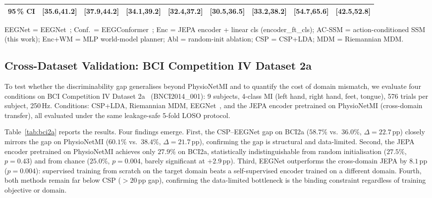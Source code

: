 \documentclass[journal]{IEEEtran}
\begin{document}
\begin{table}[t]
\begin{tabular}{crrrrrrrr}
\textbf{95\,\% CI} & [35.6,41.2] & [37.9,44.2] & [34.1,39.2] & [32.4,37.2] & [30.5,36.5] & [33.2,38.2] & [54.7,65.6] & [42.5,52.8] \\
\bottomrule
\end{tabular}
\par\vspace{2pt}
\begin{minipage}{\linewidth}
{\footnotesize\raggedright EEGNet = EEGNet~\cite{lawhern2018eegnet};
Conf.\ = EEGConformer~\cite{song2022eegconformer};
Enc = JEPA encoder + linear cls (encoder\_ft\_cls); AC-SSM = action-conditioned SSM (this work);
Enc+WM = MLP world-model planner; Abl = random-init ablation; CSP = CSP+LDA; MDM = Riemannian MDM.}
\end{minipage}
\end{table}

\subsection{Cross-Dataset Validation: BCI Competition IV Dataset 2a}
\label{sec:bci2a}

To test whether the discriminability gap generalises beyond PhysioNetMI and to quantify the cost of domain mismatch, we evaluate four conditions on BCI Competition IV Dataset 2a~\cite{brunner2008bci} (BNCI2014\_001): 9 subjects, 4-class MI (left hand, right hand, feet, tongue), 576 trials per subject, 250\,Hz.
Conditions: CSP+LDA, Riemannian MDM, EEGNet~\cite{lawhern2018eegnet}, and the JEPA encoder pretrained on PhysioNetMI (cross-domain transfer), all evaluated under the same leakage-safe 5-fold LOSO protocol.

Table~\ref{tab:bci2a} reports the results.
Four findings emerge.
First, the CSP--EEGNet gap on BCI2a ($58.7\%$ vs.\ $36.0\%$, $\Delta=22.7$\,pp) closely mirrors the gap on PhysioNetMI ($60.1\%$ vs.\ $38.4\%$, $\Delta=21.7$\,pp), confirming the gap is structural and data-limited.
Second, the JEPA encoder pretrained on PhysioNetMI achieves only $27.9\%$ on BCI2a, statistically indistinguishable from random initialisation ($27.5\%$, $p=0.43$) and from chance ($25.0\%$, $p=0.004$, barely significant at $+2.9$\,pp).
Third, EEGNet outperforms the cross-domain JEPA by $8.1$\,pp ($p=0.004$): supervised training from scratch on the target domain beats a self-supervised encoder trained on a different domain.
Fourth, both methods remain far below CSP ($>20$\,pp gap), confirming the data-limited bottleneck is the binding constraint regardless of training objective or domain.
\end{document}
